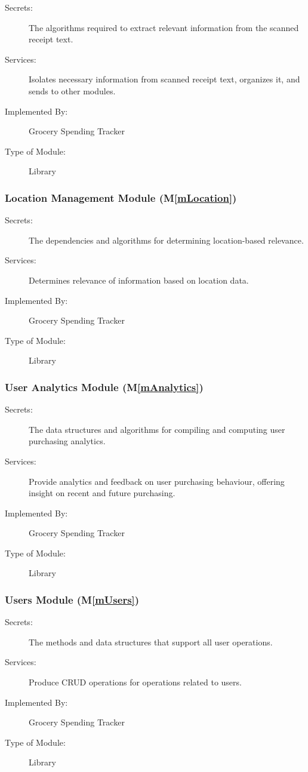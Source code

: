 \documentclass[12pt, titlepage]{article}
\newcommand{\mref}[1]{M\ref{#1}}
\begin{document}
\begin{description}
\item[Secrets:] The algorithms required to extract relevant information from the scanned receipt text.
\item[Services:] Isolates necessary information from scanned receipt text, organizes it, and sends to other
modules.
\item[Implemented By:] Grocery Spending Tracker
\item[Type of Module:] Library
\end{description}

\subsubsection{Location Management Module (\mref{mLocation})}

\begin{description}
\item[Secrets:] The dependencies and algorithms for determining location-based relevance. 
\item[Services:] Determines relevance of information based on location data.
\item[Implemented By:] Grocery Spending Tracker
\item[Type of Module:] Library
\end{description}

\subsubsection{User Analytics Module (\mref{mAnalytics})}

\begin{description}
\item[Secrets:] The data structures and algorithms for compiling and computing user purchasing analytics. 
\item[Services:] Provide analytics and feedback on user purchasing behaviour, offering insight on recent and future purchasing.
\item[Implemented By:] Grocery Spending Tracker
\item[Type of Module:] Library
\end{description}

\subsubsection{Users Module (\mref{mUsers})}

\begin{description}
\item[Secrets:] The methods and data structures that support all user operations.
\item[Services:] Produce CRUD operations for operations related to users.
\item[Implemented By:] Grocery Spending Tracker
\item[Type of Module:] Library
\end{description}
\end{document}
